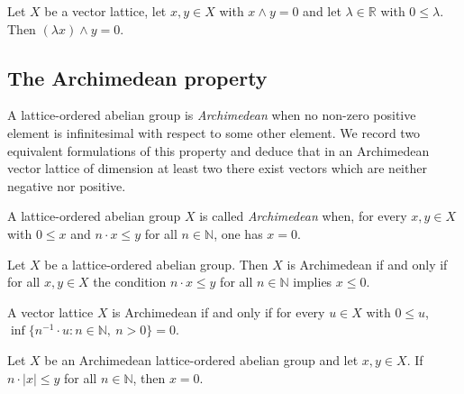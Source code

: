 \begin{lemma}
\label{lem:disjoint-smul}
\leanok
{}
Let $X$ be a vector lattice, let $x, y \in X$ with $x \wedge y = 0$ and
let $\lambda \in \mathbb{R}$ with $0 \le \lambda$. Then
$(\lambda x) \wedge y = 0.$
\end{lemma}

\subsection{The Archimedean property}

A lattice-ordered abelian group is \emph{Archimedean} when no non-zero
positive element is infinitesimal with respect to some other element.
We record two equivalent formulations of this property and deduce that
in an Archimedean vector lattice of dimension at least two there exist
vectors which are neither negative nor positive.

\begin{definition}
\label{def:is-vl-archimedean}
\leanok
A lattice-ordered abelian group $X$ is called \emph{Archimedean} when,
for every $x, y \in X$ with $0 \le x$ and $n \cdot x \le y$ for all
$n \in \mathbb{N}$, one has $x = 0$.
\end{definition}

\begin{lemma}
\label{lem:is-vl-archimedean-iff-le-zero}
\leanok
{}
Let $X$ be a lattice-ordered abelian group. Then $X$ is Archimedean if
and only if for all $x, y \in X$ the condition $n \cdot x \le y$ for all
$n \in \mathbb{N}$ implies $x \le 0$.
\end{lemma}

\begin{lemma}
\label{lem:is-vl-archimedean-iff-isGLB-inv-smul}
\leanok
{}
A vector lattice $X$ is Archimedean if and only if for every $u \in X$
with $0 \le u$,
$\inf \{ n^{-1} \cdot u : n \in \mathbb{N},\ n > 0 \} = 0$.
\end{lemma}

\begin{lemma}
\label{lem:infinitesimal-eq-zero}
\leanok
{}
Let $X$ be an Archimedean lattice-ordered abelian group and let
$x, y \in X$. If $n \cdot \lvert x \rvert \le y$ for all $n \in
\mathbb{N}$, then $x = 0$.
\end{lemma}

